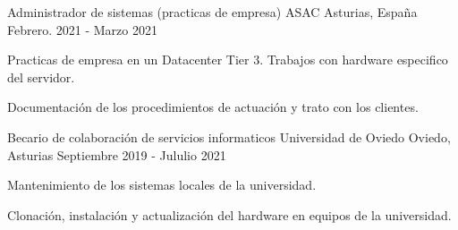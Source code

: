 \begin{cventries}
    \cventry
    {Administrador de sistemas (practicas de empresa)} %
    {ASAC} %
    {Asturias, España} %
    {Febrero. 2021 - Marzo 2021} %
    {
        \begin{cvitems} %
            \item {Practicas de empresa en un Datacenter Tier 3. Trabajos con hardware especifico del servidor.}
            \item {Documentación de los procedimientos de actuación y trato con los clientes.}
        \end{cvitems}
    }

    \cventry
    {Becario de colaboración de servicios informaticos} %
    {Universidad de Oviedo} %
    {Oviedo, Asturias} %
    {Septiembre 2019 - Jululio 2021} %
    {
        \begin{cvitems} %
            \item {Mantenimiento de los sistemas locales de la universidad.}
            \item {Clonación, instalación y actualización del hardware en equipos de la universidad.}
        \end{cvitems}
    }

\end{cventries}
